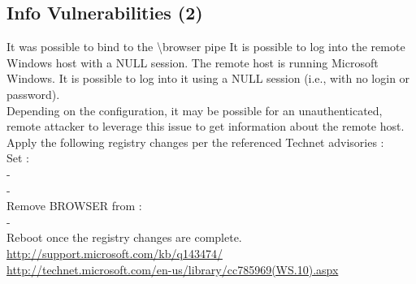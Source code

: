 
\subsection{Info Vulnerabilities (2)}
\begin{tcolorbox}[
	title=Microsoft Windows SMB NULL Session Authentication - Nessus Plugin ID 26920,
	colback=green!5!white,
	colframe=green!75!black,
	subtitle style={boxrule=0.4pt, colback=green!50!white}	
	] 
	It was possible to bind to the \textbackslash browser pipe
It is possible to log into the remote Windows host with a NULL session.
The remote host is running Microsoft Windows. It is possible to log into it using a NULL session (i.e., with no login or password).\\
Depending on the configuration, it may be possible for an unauthenticated, remote attacker to leverage this issue to get information about the remote host.
Apply the following registry changes per the referenced Technet advisories :\\
Set :\\
-\\
-\\
Remove BROWSER from :\\
-\\ 
Reboot once the registry changes are complete.
\url{http://support.microsoft.com/kb/q143474/}\\
\url{http://technet.microsoft.com/en-us/library/cc785969(WS.10).aspx}
\end{tcolorbox}
